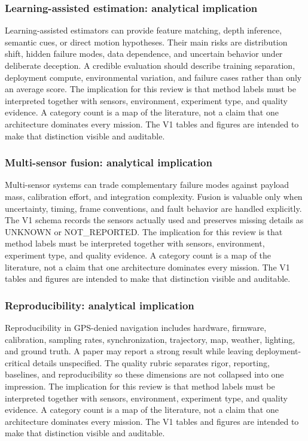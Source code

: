 \documentclass[
  journal,
  10pt]{IEEEtran}
\begin{document}
\subsubsection{Learning-assisted estimation: analytical
implication}\label{learning-assisted-estimation-analytical-implication}

Learning-assisted estimators can provide feature matching, depth
inference, semantic cues, or direct motion hypotheses. Their main risks
are distribution shift, hidden failure modes, data dependence, and
uncertain behavior under deliberate deception. A credible evaluation
should describe training separation, deployment compute, environmental
variation, and failure cases rather than only an average score. The
implication for this review is that method labels must be interpreted
together with sensors, environment, experiment type, and quality
evidence. A category count is a map of the literature, not a claim that
one architecture dominates every mission. The V1 tables and figures are
intended to make that distinction visible and auditable.

\subsubsection{Multi-sensor fusion: analytical
implication}\label{multi-sensor-fusion-analytical-implication}

Multi-sensor systems can trade complementary failure modes against
payload mass, calibration effort, and integration complexity. Fusion is
valuable only when uncertainty, timing, frame conventions, and fault
behavior are handled explicitly. The V1 schema records the sensors
actually used and preserves missing details as UNKNOWN or NOT\_REPORTED.
The implication for this review is that method labels must be
interpreted together with sensors, environment, experiment type, and
quality evidence. A category count is a map of the literature, not a
claim that one architecture dominates every mission. The V1 tables and
figures are intended to make that distinction visible and auditable.

\subsubsection{Reproducibility: analytical
implication}\label{reproducibility-analytical-implication}

Reproducibility in GPS-denied navigation includes hardware, firmware,
calibration, sampling rates, synchronization, trajectory, map, weather,
lighting, and ground truth. A paper may report a strong result while
leaving deployment-critical details unspecified. The quality rubric
separates rigor, reporting, baselines, and reproducibility so these
dimensions are not collapsed into one impression. The implication for
this review is that method labels must be interpreted together with
sensors, environment, experiment type, and quality evidence. A category
count is a map of the literature, not a claim that one architecture
dominates every mission. The V1 tables and figures are intended to make
that distinction visible and auditable.
\end{document}
